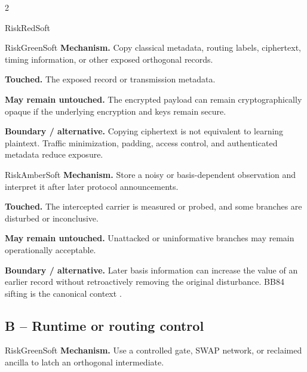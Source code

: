 \begin{multicols}{2}
\begin{matrixrecord}{RiskRedSoft}
\hfill\matrixback
\end{matrixrecord}

\hypertarget{cell:A5}{}
\begin{matrixrecord}{RiskGreenSoft}
\textbf{Mechanism.} Copy classical metadata, routing labels, ciphertext, timing information, or other exposed orthogonal records.

\textbf{Touched.} The exposed record or transmission metadata.

\textbf{May remain untouched.} The encrypted payload can remain cryptographically opaque if the underlying encryption and keys remain secure.

\textbf{Boundary / alternative.} Copying ciphertext is not equivalent to learning plaintext. Traffic minimization, padding, access control, and authenticated metadata reduce exposure.

\hfill\matrixback
\end{matrixrecord}

\hypertarget{cell:A6}{}
\begin{matrixrecord}{RiskAmberSoft}
\textbf{Mechanism.} Store a noisy or basis-dependent observation and interpret it after later protocol announcements.

\textbf{Touched.} The intercepted carrier is measured or probed, and some branches are disturbed or inconclusive.

\textbf{May remain untouched.} Unattacked or uninformative branches may remain operationally acceptable.

\textbf{Boundary / alternative.} Later basis information can increase the value of an earlier record without retroactively removing the original disturbance. BB84 sifting is the canonical context \cite{bennett1984bb84}.

\hfill\matrixback
\end{matrixrecord}

\subsection*{B -- Runtime or routing control}
\hypertarget{cell:B1}{}
\begin{matrixrecord}{RiskGreenSoft}
\textbf{Mechanism.} Use a controlled gate, SWAP network, or reclaimed ancilla to latch an orthogonal intermediate.


\end{matrixrecord}
\end{multicols}
